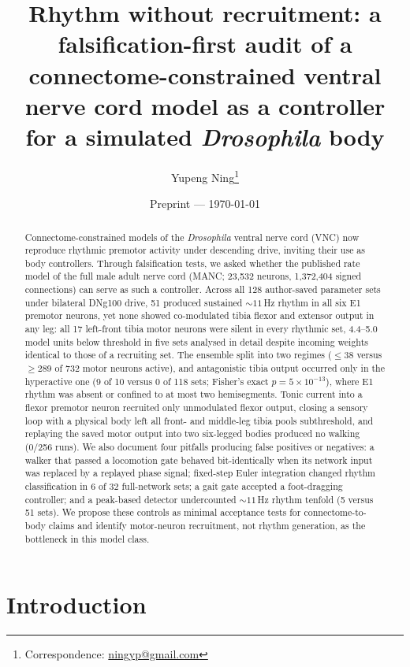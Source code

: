 \documentclass[11pt]{article}
\title{Rhythm without recruitment: a falsification-first audit of a connectome-constrained ventral nerve cord model as a controller for a simulated \textit{Drosophila} body}
\author[1]{Yupeng Ning\thanks{Correspondence: \href{mailto:ningyp@gmail.com}{ningyp@gmail.com}}}
\affil[1]{Beijing ZHYU Tech Corp, Beijing, China}
\date{Preprint --- \today}
\begin{document}
\maketitle

\begin{abstract}
\noindent
Connectome-constrained models of the \textit{Drosophila} ventral nerve cord (VNC) now reproduce rhythmic premotor activity under descending drive, inviting their use as body controllers. Through falsification tests, we asked whether the published rate model of the full male adult nerve cord (MANC; 23,532 neurons, 1,372,404 signed connections) can serve as such a controller. Across all 128 author-saved parameter sets under bilateral DNg100 drive, 51 produced sustained ${\sim}11$\,Hz rhythm in all six E1 premotor neurons, yet none showed co-modulated tibia flexor and extensor output in any leg: all 17 left-front tibia motor neurons were silent in every rhythmic set, 4.4--5.0 model units below threshold in five sets analysed in detail despite incoming weights identical to those of a recruiting set. The ensemble split into two regimes ($\leq$38 versus $\geq$289 of 732 motor neurons active), and antagonistic tibia output occurred only in the hyperactive one (9 of 10 versus 0 of 118 sets; Fisher's exact $p=5\times10^{-13}$), where E1 rhythm was absent or confined to at most two hemisegments. Tonic current into a flexor premotor neuron recruited only unmodulated flexor output, closing a sensory loop with a physical body left all front- and middle-leg tibia pools subthreshold, and replaying the saved motor output into two six-legged bodies produced no walking (0/256 runs). We also document four pitfalls producing false positives or negatives: a walker that passed a locomotion gate behaved bit-identically when its network input was replaced by a replayed phase signal; fixed-step Euler integration changed rhythm classification in 6 of 32 full-network sets; a gait gate accepted a foot-dragging controller; and a peak-based detector undercounted ${\sim}11$\,Hz rhythm tenfold (5 versus 51 sets). We propose these controls as minimal acceptance tests for connectome-to-body claims and identify motor-neuron recruitment, not rhythm generation, as the bottleneck in this model class.
\end{abstract}

\section{Introduction}
\end{document}
